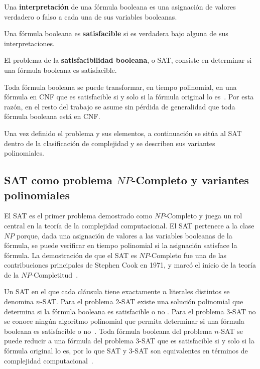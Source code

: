 Una \textbf{interpretación} de una fórmula booleana es una asignación
de valores verdadero o falso a cada una de sus
variables booleanas.

Una fórmula booleana es \textbf{satisfacible} si es verdadera bajo
alguna de sus interpretaciones.

\begin{definicion}
El problema de la \textbf{satisfacibilidad booleana}, o SAT, consiste
en determinar si una fórmula booleana es satisfacible.
\end{definicion}

Toda fórmula booleana se puede transformar, en tiempo polinomial, en
una fórmula en CNF que es satisfacible si y solo si la fórmula
original lo es~\cite{hopcroft2006introduction}. Por esta razón, en el
resto del trabajo se asume sin pérdida de generalidad que toda
fórmula booleana está en CNF.

Una vez definido el problema y sus elementos, a continuación se sitúa
al SAT dentro de la clasificación de complejidad y se describen sus
variantes polinomiales.

\subsection{SAT como problema $NP$-Completo y variantes polinomiales}
\label{sec:sat-variantes}

El SAT es el primer problema demostrado como $NP$-Completo y juega un
rol central en la teoría de la complejidad computacional. El SAT pertenece a la clase
$NP$ porque, dada una asignación de valores a las variables booleanas de la
fórmula, se puede verificar en tiempo polinomial si la asignación
satisface la fórmula. La demostración de que el SAT es $NP$-Completo
fue una de las contribuciones principales de Stephen Cook en
1971, y marcó el inicio de la teoría de la
$NP$-Completitud~\cite{cook1971}.

Un SAT en el que cada cláusula tiene exactamente $n$ literales distintos
se denomina $n$-SAT. Para el problema 2-SAT existe una solución
polinomial que determina si la fórmula booleana es satisfacible o no
\cite{halim2013cp3}. Para el problema 3-SAT no se conoce ningún
algoritmo polinomial que permita determinar si una fórmula booleana es
satisfacible o no~\cite{hopcroft2006introduction}. Toda fórmula booleana
del problema $n$-SAT se puede reducir a una fórmula del problema
3-SAT que es satisfacible si y solo si la fórmula original lo es, por
lo que SAT y 3-SAT son equivalentes en términos de complejidad
computacional~\cite{hopcroft2006introduction}.

